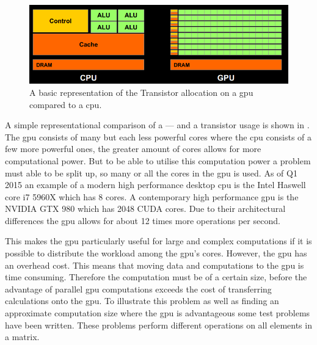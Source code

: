 \begin{figure}[h!]
\centering
 \includegraphics[width=1\textwidth]{figures/GPUCPUimage.png} %
\caption{A basic representation of the Transistor allocation on a \acrshort{gpu} compared to a \acrshort{cpu}. \citep{NvidiaCUDASeminar}}\label{image:gpucpuimage}
\vspace{-15pt}
\end{figure}

A simple representational comparison of a  --- and a  transistor usage is shown in .
The \acrshort{gpu} consists of many but each less powerful cores where the \acrshort{cpu} consists of a few more powerful ones, the greater amount of cores allows for more computational power.
But to be able to utilise this computation power a problem must able to be split up, so many or all the cores in the \acrshort{gpu} is used.
As of Q1 2015 an example of a modern high performance desktop \acrshort{cpu} is the Intel Haswell core i7 5960X which has 8 cores. \citep{puget}
A contemporary high performance \acrshort{gpu} is the NVIDIA GTX 980 which has 2048 CUDA cores. \citep{techpowerup,gtx980}
Due to their architectural differences the \acrshort{gpu} allows for about 12 times more operations per second.

This makes the \acrshort{gpu} particularly useful for large and complex computations if it is possible to distribute the workload among the \acrshort{gpu}'s cores.
However,  the \acrshort{gpu} has an overhead cost. 
This means that moving data and computations to the \acrshort{gpu} is time consuming.
Therefore the computation must be of a certain size, before the advantage of parallel \acrshort{gpu} computations exceeds the cost of transferring calculations onto the \acrshort{gpu}.
To illustrate this problem as well as finding an approximate computation size where the \acrshort{gpu} is advantageous some test problems have been written. 
These problems perform different operations on all elements in a matrix. 

